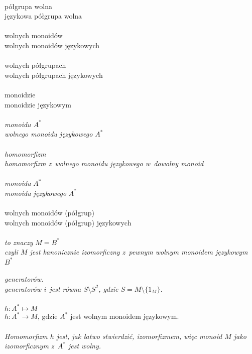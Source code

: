 \documentclass[a4paper,11pt]{article}
\begin{document}
 \\
\Jest  półgrupa wolna \\
\Powin językowa półgrupa wolna \\
 \\
\Jest  wolnych monoidów \\
\Powin wolnych monoidów językowych \\
 \\
\Jest  wolnych półgrupach \\
\Powin wolnych półgrupach językowych \\
 \\
\Jest  monoidzie \\
\Powin monoidzie językowym \\
 \\
\Jest  \textit{monoidu $A^{ * }$} \\
\Powin \textit{wolnego monoidu językowego $A^{ * }$} \\
 \\
\Jest  \textit{homomorfizm} \\
\Powin \textit{homomorfizm z~wolnego monoidu językowego w~dowolny monoid} \\
 \\
\Jest  \textit{monoidu} $A^{ * }$ \\
\Powin \textit{monoidu językowego} $A^{ * }$ \\
 \\
\Jest  wolnych monoidów (półgrup) \\
\Powin wolnych monoidów (półgrup) językowych \\
 \\
\Jest  \textit{to znaczy} $M = B^{ * }$ \\
\Powin \textit{czyli $M$ jest kanonicznie izomorficzny z~pewnym wolnym
  monoidem językowym $B^{ * }$} \\
 \\
\Jest  \textit{generatorów.} \\
\Powin \textit{generatorów i~jest równa $S \setminus S^{ 2 }$, gdzie
  $S = M \setminus \{ 1_{ M } \}$}. \\
 \\
\Jest  $h : A^{ * } \mapsto M$ \\
\Powin $h : A^{ * } \to M$, gdzie $A^{ * }$ jest wolnym monoidem językowym. \\
 \\
\Jest  \textit{Homomorfizm $h$ jest, jak łatwo stwierdzić, izomorfizmem,
  więc monoid $M$ jako izomorficznym z~$A^{ * }$ jest wolny.} \\
\end{document}
